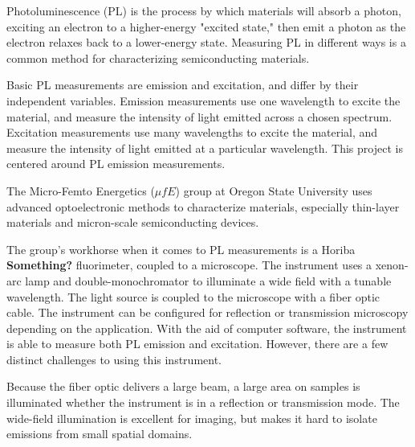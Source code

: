 
Photoluminescence (PL) is the process by which materials will absorb a photon, exciting an electron to a higher-energy "excited state," then emit a photon as the electron relaxes back to a lower-energy state. Measuring PL in different ways is a common method for characterizing semiconducting materials.

Basic PL measurements are emission and excitation, and differ by their independent variables. Emission measurements use one wavelength to excite the material, and measure the intensity of light emitted across a chosen spectrum. Excitation measurements use many wavelengths to excite the material, and measure the intensity of light emitted at a particular wavelength. This project is centered around PL emission measurements.

The Micro-Femto Energetics ($\mu fE$) group at Oregon State University uses advanced optoelectronic methods to characterize materials, especially thin-layer materials and micron-scale semiconducting devices.

The group's workhorse when it comes to PL measurements is a Horiba \textbf{Something?} fluorimeter, coupled to a  microscope. The instrument uses a  xenon-arc lamp and double-monochromator to illuminate a wide field with a tunable wavelength. The light source is coupled to the microscope with a fiber optic cable. The instrument can be configured for reflection or transmission microscopy depending on the application. With the aid of computer software, the instrument is able to measure both PL emission and excitation. However, there are a few distinct challenges to using this instrument.

Because the fiber optic delivers a large beam, a large area on samples is illuminated whether the instrument is in a reflection or transmission mode. The wide-field illumination is excellent for imaging, but makes it hard to isolate emissions from small spatial domains.




